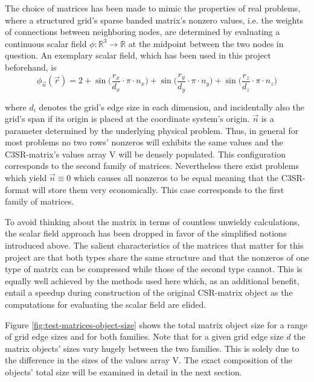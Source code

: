     The choice of matrices has been made to mimic the properties of real problems, where a structured grid's sparse
    banded matrix's nonzero values, i.e. the weights of connections between neighboring nodes, are determined by
    evaluating a continuous scalar field $\phi: \mathbb{R}^3 \rightarrow \mathbb{R}$ at the midpoint between the two
    nodes in question. An exemplary scalar field, which has been used in this project beforehand, is
    $$
    \phi_{\vec{n}}(\vec{r}) = 2+
      \sin\bigg(\frac{r_x}{d_x}\cdot \pi \cdot n_x \bigg)+
      \sin\bigg(\frac{r_y}{d_y}\cdot \pi \cdot n_y \bigg)+
      \sin\bigg(\frac{r_z}{d_z}\cdot \pi \cdot n_z \bigg)
    $$

    where $d_i$ denotes the grid's edge size in each dimension, and incidentally also the grid's span if its origin is
    placed at the coordinate system's origin. $\vec{n}$ is a parameter determined by the underlying physical problem.
    Thus, in general for most problems no two rows' nonzeros will exhibits the same values and the C3SR-matrix's values
    array V will be densely populated. This configuration corresponds to the second family of matrices. Nevertheless
    there exist problems which yield $\vec{n} \equiv 0$ which causes all nonzeros to be equal meaning that the
    C3SR-format will store them very economically. This case corresponds to the first family of matrices.

    To avoid thinking about the matrix in terms of countless unwieldy calculations, the scalar field approach has been
    dropped in favor of the simplified notions introduced above. The salient characteristics of the matrices that matter
    for this project are that both types share the same structure and that the nonzeros of one type of matrix can be
    compressed while those of the second type cannot. This is equally well achieved by the methods used here which, as
    an additional benefit, entail a speedup during construction of the original CSR-matrix object as the computations
    for evaluating the scalar field are elided.

    Figure \ref{fig:test-matrices-object-size} shows the total matrix object size for a range of grid edge sizes and for
    both families. Note that for a given grid edge size $d$ the matrix objects' sizes vary hugely between the two
    families. This is solely due to the difference in the sizes of the values array V. The exact composition of the
    objects' total size will be examined in detail in the next section.

